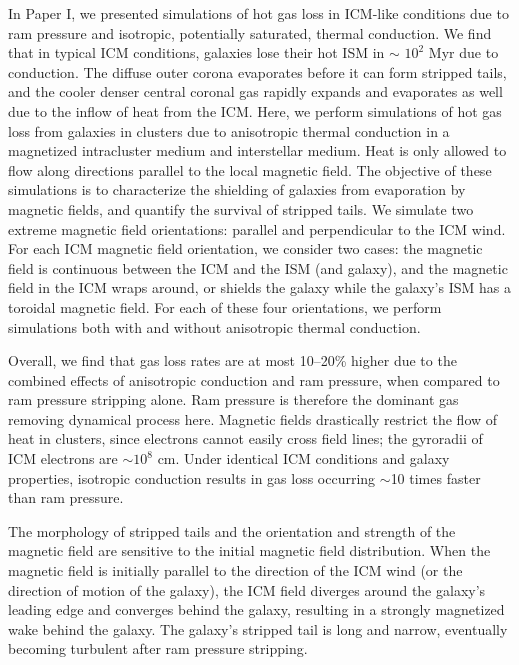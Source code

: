 \documentclass[twocolumn]{aastex6}
\begin{document}
In Paper I, we presented simulations of hot gas loss in ICM-like conditions due to ram pressure and isotropic, potentially saturated, thermal conduction. We find that in typical ICM conditions, galaxies lose their hot ISM in $\sim$ $10^2$ Myr due to conduction. The diffuse outer corona evaporates before it can form stripped tails, and the cooler denser central coronal gas rapidly expands and evaporates as well due to the inflow of heat from the ICM. Here, we perform simulations of hot gas loss from galaxies in clusters due to anisotropic thermal conduction in a magnetized intracluster medium and interstellar medium. Heat is only allowed to flow along directions parallel to the local magnetic field. The objective of these simulations is to characterize the shielding of galaxies from evaporation by magnetic fields, and quantify the survival of stripped tails. We simulate two extreme magnetic field orientations: parallel and perpendicular to the ICM wind. For each ICM magnetic field orientation, we consider two cases: the magnetic field is continuous between the ICM and the ISM (and galaxy), and the magnetic field in the ICM wraps around, or shields the galaxy while the galaxy's ISM has a toroidal magnetic field. For each of these four orientations, we perform simulations both with and without anisotropic thermal conduction. 

Overall, we find that gas loss rates are at most 10--20\% higher due to the combined effects of anisotropic conduction and ram pressure, when compared to ram pressure stripping alone.  Ram pressure is therefore the dominant gas removing dynamical process here. Magnetic fields drastically restrict the flow of heat in clusters, since electrons cannot easily cross field lines; the gyroradii of ICM electrons are $\sim 10^8$ cm. Under identical ICM conditions and galaxy properties, isotropic conduction results in gas loss occurring $\sim$10 times faster than ram pressure. 

The morphology of stripped tails and the orientation and strength of the magnetic field are sensitive to the initial magnetic field distribution. When the magnetic field is initially parallel to the direction of the ICM wind (or the direction of motion of the galaxy), the ICM field diverges around the galaxy's leading edge and converges behind the galaxy, resulting in a strongly magnetized wake behind the galaxy. The galaxy's stripped tail is long and narrow, eventually becoming turbulent after ram pressure stripping. 
\end{document}

